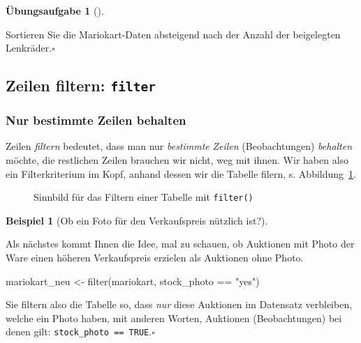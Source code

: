\documentclass[
  a4paper,
  DIV=11]{scrreprt}
\newenvironment{Shaded}{\begin{snugshade}}{\end{snugshade}}
\newcommand{\FunctionTok}[1]{\textcolor[rgb]{0.28,0.35,0.67}{#1}}
\newcommand{\NormalTok}[1]{\textcolor[rgb]{0.00,0.23,0.31}{#1}}
\newcommand{\OtherTok}[1]{\textcolor[rgb]{0.00,0.23,0.31}{#1}}
\newcommand{\SpecialCharTok}[1]{\textcolor[rgb]{0.37,0.37,0.37}{#1}}
\newcommand{\StringTok}[1]{\textcolor[rgb]{0.13,0.47,0.30}{#1}}
\theoremstyle{definition}
\newtheorem{exercise}{Übungsaufgabe}[chapter]
\theoremstyle{definition}
\newtheorem{example}{Beispiel}[chapter]
\theoremstyle{definition}
\theoremstyle{remark}
\begin{document}
\begin{exercise}[]\protect\hypertarget{exr-arrange2}{}\label{exr-arrange2}

Sortieren Sie die Mariokart-Daten absteigend nach der Anzahl der
beigelegten Lenkräder.\(\square\)

\end{exercise}

\subsection{\texorpdfstring{Zeilen filtern:
\texttt{filter}}{Zeilen filtern: filter}}\label{zeilen-filtern-filter}

\subsubsection{Nur bestimmte Zeilen
behalten}\label{nur-bestimmte-zeilen-behalten}

Zeilen \emph{filtern} bedeutet, dass man nur \emph{bestimmte}
\emph{Zeilen} (Beobachtungen) \emph{behalten} möchte, die restlichen
Zeilen brauchen wir nicht, weg mit ihnen. Wir haben also ein
Filterkriterium im Kopf, anhand dessen wir die Tabelle filern, s.
Abbildung~\ref{fig-filter}.

\begin{figure}


\caption{\label{fig-filter}Sinnbild für das Filtern einer Tabelle mit
\texttt{filter()}}

\end{figure}%

\begin{example}[Ob ein Foto für den Verkaufspreis nützlich
ist?]\protect\hypertarget{exm-filter}{}\label{exm-filter}

Als nächstes kommt Ihnen die Idee, mal zu schauen, ob Auktionen mit
Photo der Ware einen höheren Verkaufspreis erzielen als Auktionen ohne
Photo.

\begin{Shaded}
\begin{Highlighting}[]
\NormalTok{mariokart\_neu }\OtherTok{\textless{}{-}} \FunctionTok{filter}\NormalTok{(mariokart, stock\_photo }\SpecialCharTok{==} \StringTok{"yes"}\NormalTok{)}
\end{Highlighting}
\end{Shaded}

Sie filtern also die Tabelle so, dass \emph{nur} diese Auktionen im
Datensatz verbleiben, welche ein Photo haben, mit anderen Worten,
Auktionen (Beobachtungen) bei denen gilt:
\texttt{stock\_photo\ ==\ TRUE}.\(\square\)

\end{example}
\end{document}
